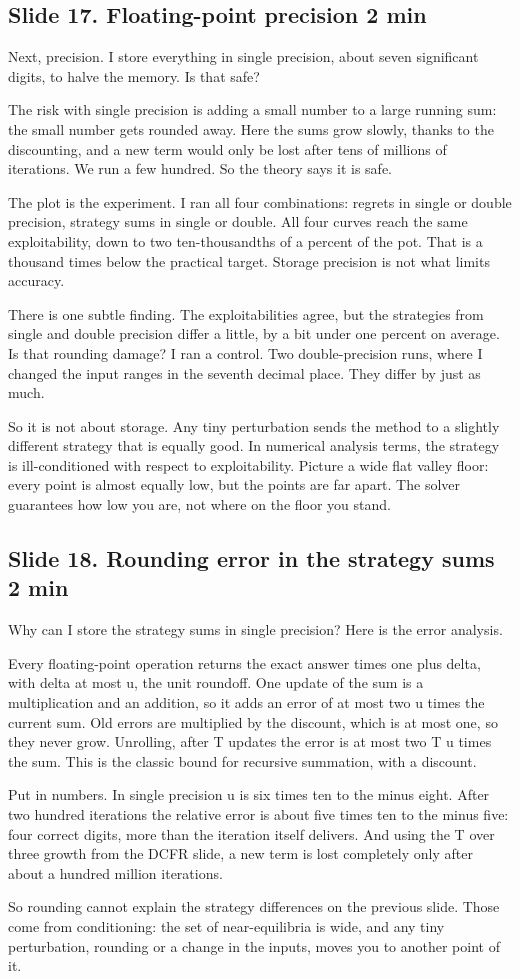 \documentclass[11pt]{article}
\newcommand{\slidehead}[3]{\subsection*{Slide #1. #2 \hfill {\normalfont\small #3}}}
\begin{document}
\slidehead{17}{Floating-point precision}{2 min}
\begin{say}
Next, precision. I store everything in single precision, about seven significant digits, to halve the memory. Is
that safe?

The risk with single precision is adding a small number to a large running sum: the small number gets rounded
away. Here the sums grow slowly, thanks to the discounting, and a new term would only be lost after tens of
millions of iterations. We run a few hundred. So the theory says it is safe.

The plot is the experiment. I ran all four combinations: regrets in single or double precision, strategy sums in
single or double. All four curves reach the same exploitability, down to two ten-thousandths of a percent of the
pot. That is a thousand times below the practical target. Storage precision is not what limits accuracy.

There is one subtle finding. The exploitabilities agree, but the strategies from single and double precision differ
a little, by a bit under one percent on average. Is that rounding damage? I ran a control. Two double-precision
runs, where I changed the input ranges in the seventh decimal place. They differ by just as much.

So it is not about storage. Any tiny perturbation sends the method to a slightly different strategy that is
equally good. In numerical analysis terms, the strategy is ill-conditioned with respect to exploitability. Picture a
wide flat valley floor: every point is almost equally low, but the points are far apart. The solver guarantees how
low you are, not where on the floor you stand.
\end{say}

\slidehead{18}{Rounding error in the strategy sums}{2 min}
\begin{say}
Why can I store the strategy sums in single precision? Here is the error analysis.

Every floating-point operation returns the exact answer times one plus delta, with delta at most u, the unit
roundoff. One update of the sum is a multiplication and an addition, so it adds an error of at most two u times the
current sum. Old errors are multiplied by the discount, which is at most one, so they never grow. Unrolling, after T
updates the error is at most two T u times the sum. This is the classic bound for recursive summation, with a
discount.

Put in numbers. In single precision u is six times ten to the minus eight. After two hundred iterations the
relative error is about five times ten to the minus five: four correct digits, more than the iteration itself
delivers. And using the T over three growth from the DCFR slide, a new term is lost completely only after about a
hundred million iterations.

So rounding cannot explain the strategy differences on the previous slide. Those come from conditioning: the set of
near-equilibria is wide, and any tiny perturbation, rounding or a change in the inputs, moves you to another point of
it.
\end{say}
\end{document}
